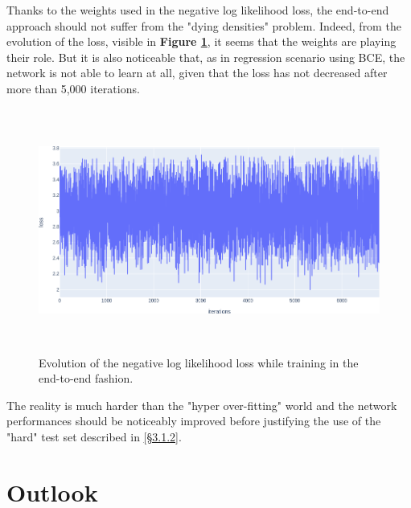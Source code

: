 \documentclass{article}
\begin{document}
Thanks to the weights used in the negative log likelihood loss, the end-to-end approach should not suffer from the "dying densities" problem. Indeed, from the evolution of the loss, visible in \textbf{Figure \ref{fig:loss_end-to-end}}, it seems that the weights are playing their role. But it is also noticeable that, as in regression scenario using BCE, the network is not able to learn at all, given that the loss has not decreased after more than 5,000 iterations.
\begin{figure}[H]
    \centering
    \includegraphics[height=8cm,width=\textwidth,keepaspectratio]{loss_end-to-end.png}
    \caption{Evolution of the negative log likelihood loss while training in the end-to-end fashion.}
    \label{fig:loss_end-to-end}
\end{figure}

The reality is much harder than the "hyper over-fitting" world and the network performances should be noticeably improved before justifying the use of the "hard" test set described in \hyperref[sec:hard]{[\S3.1.2]}.

\clearpage

\section{Outlook}
\end{document}
